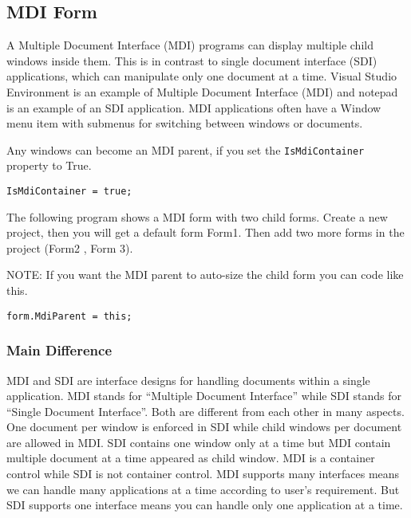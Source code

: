 \subsection*{MDI Form}
A Multiple Document Interface (MDI) programs can display multiple child windows inside them. This is in contrast to single document interface (SDI) applications, which can manipulate only one document at a time. Visual Studio Environment is an example of Multiple Document Interface (MDI) and notepad is an example of an SDI application. MDI applications often have a Window menu item with submenus for switching between windows or documents.


Any windows can become an MDI parent, if you set the \texttt{IsMdiContainer} property to True.

\begin{lstlisting}[numbers=none]
	IsMdiContainer = true;
\end{lstlisting}

The following {\cs} program shows a MDI form with two child forms. Create a new {\cs} project, then you will get a default form Form1. Then add two more forms in the project (Form2 , Form 3). 

NOTE: If you want the MDI parent to auto-size the child form you can code like this.

\begin{lstlisting}[numbers=none]
	form.MdiParent = this;
\end{lstlisting}



\subsubsection*{Main Difference}
MDI and SDI are interface designs for handling documents within a single application. MDI stands
for “Multiple Document Interface” while SDI stands for “Single Document Interface”. Both are
different from each other in many aspects. One document per window is enforced in SDI while
child windows per document are allowed in MDI. SDI contains one window only at a time but MDI
contain multiple document at a time appeared as child window. MDI is a container control while
SDI is not container control. MDI supports many interfaces means we can handle many applications
at a time according to user’s requirement. But SDI supports one interface means you can handle
only one application at a time.

